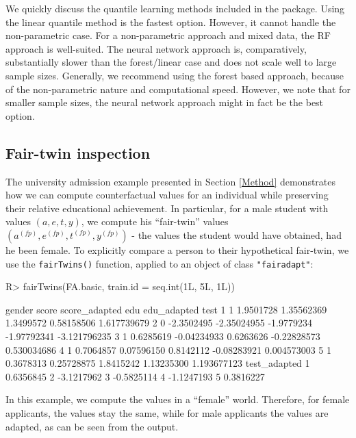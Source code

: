 \documentclass[
  notitle]{jss}
\begin{document}
We quickly discuss the quantile learning methods included in the
package. Using the linear quantile method is the fastest option.
However, it cannot handle the non-parametric case. For a non-parametric
approach and mixed data, the RF approach is well-suited. The neural
network approach is, comparatively, substantially slower than the
forest/linear case and does not scale well to large sample sizes.
Generally, we recommend using the forest based approach, because of the
non-parametric nature and computational speed. However, we note that for
smaller sample sizes, the neural network approach might in fact be the
best option.

\hypertarget{fair-twin-inspection}{%
\subsection{Fair-twin inspection}\label{fair-twin-inspection}}

The university admission example presented in Section \ref{Method}
demonstrates how we can compute counterfactual values for an individual
while preserving their relative educational achievement. In particular,
for a male student with values \((a, e, t, y)\), we compute his
``fair-twin'' values
\(( {a}^{(fp)},  {e}^{(fp)},  {t}^{(fp)},  {y}^{(fp)})\) - the values
the student would have obtained, had he been female. To explicitly
compare a person to their hypothetical fair-twin, we use the
\texttt{fairTwins()} function, applied to an object of class
\texttt{"fairadapt"}:

\begin{CodeChunk}
\begin{CodeInput}
R> fairTwins(FA.basic, train.id = seq.int(1L, 5L, 1L))
\end{CodeInput}
\begin{CodeOutput}
  gender      score score_adapted        edu edu_adapted         test
1      1  1.9501728    1.35562369  1.3499572  0.58158506  1.617739679
2      0 -2.3502495   -2.35024955 -1.9779234 -1.97792341 -3.121796235
3      1  0.6285619   -0.04234933  0.6263626 -0.22828573  0.530034686
4      1  0.7064857    0.07596150  0.8142112 -0.08283921  0.004573003
5      1  0.3678313    0.25728875  1.8415242  1.13235300  1.193677123
  test_adapted
1    0.6356845
2   -3.1217962
3   -0.5825114
4   -1.1247193
5    0.3816227
\end{CodeOutput}
\end{CodeChunk}

In this example, we compute the values in a ``female'' world. Therefore,
for female applicants, the values stay the same, while for male
applicants the values are adapted, as can be seen from the output.
\end{document}
